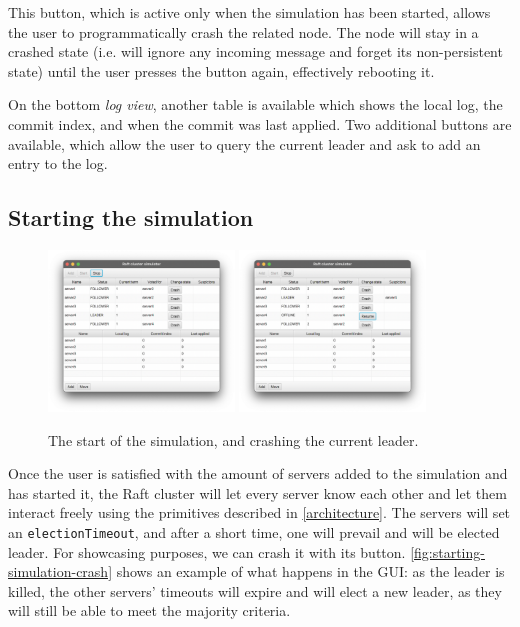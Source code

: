 This button, which is active only when the simulation has been started, allows the user to programmatically crash the related node. The node will stay in a crashed state (i.e. will ignore any incoming message and forget its non-persistent state) until the user presses the button again, effectively rebooting it.

On the bottom \textit{log view}, another table is available which shows the local log, the commit index, and when the commit was last applied. Two additional buttons are available, which allow the user to query the current leader and ask to add an entry to the log.

\subsection{Starting the simulation}

\begin{figure}[ht]
    \centering
    \includegraphics[width=0.44\textwidth]{drawable/1-starting-simulation.png}
    \includegraphics[width=0.44\textwidth]{drawable/2-crashing-leader.png}
    
    \caption{The start of the simulation, and crashing the current leader.}
    \label{fig:starting-simulation-crash}
\end{figure}

Once the user is satisfied with the amount of servers added to the simulation and has started it, the Raft cluster will let every server know each other and let them interact freely using the primitives described in \autoref{architecture}. The servers will set an \texttt{electionTimeout}, and after a short time, one will prevail and will be elected leader. For showcasing purposes, we can crash it with its button. \autoref{fig:starting-simulation-crash} shows an example of what happens in the GUI: as the leader is killed, the other servers' timeouts will expire and will elect a new leader, as they will still be able to meet the majority criteria.


